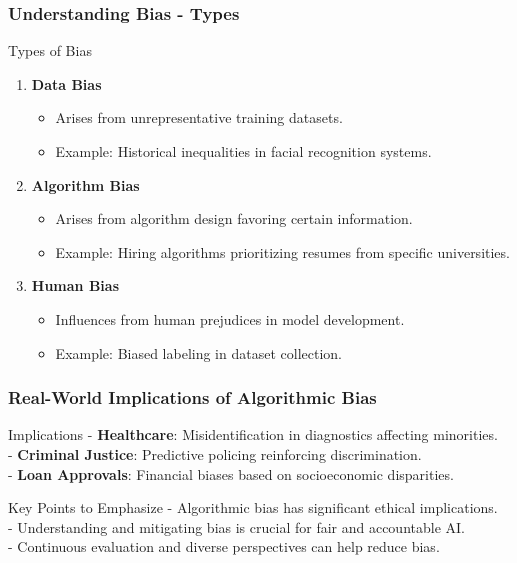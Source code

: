 \documentclass[aspectratio=169]{beamer}
\begin{document}
\begin{frame}[fragile]
    \frametitle{Understanding Bias - Types}
    \begin{block}{Types of Bias}
        \begin{enumerate}
            \item \textbf{Data Bias}
            \begin{itemize}
                \item Arises from unrepresentative training datasets.
                \item Example: Historical inequalities in facial recognition systems.
            \end{itemize}

            \item \textbf{Algorithm Bias}
            \begin{itemize}
                \item Arises from algorithm design favoring certain information.
                \item Example: Hiring algorithms prioritizing resumes from specific universities.
            \end{itemize}

            \item \textbf{Human Bias}
            \begin{itemize}
                \item Influences from human prejudices in model development.
                \item Example: Biased labeling in dataset collection.
            \end{itemize}
        \end{enumerate}
    \end{block}
\end{frame}

\begin{frame}[fragile]
    \frametitle{Real-World Implications of Algorithmic Bias}
    \begin{block}{Implications}
        - \textbf{Healthcare}: Misidentification in diagnostics affecting minorities.\\
        - \textbf{Criminal Justice}: Predictive policing reinforcing discrimination.\\
        - \textbf{Loan Approvals}: Financial biases based on socioeconomic disparities.
    \end{block}

    \begin{block}{Key Points to Emphasize}
        - Algorithmic bias has significant ethical implications.\\
        - Understanding and mitigating bias is crucial for fair and accountable AI.\\
        - Continuous evaluation and diverse perspectives can help reduce bias.
    \end{block}
\end{frame}
\end{document}

